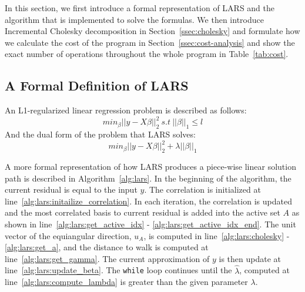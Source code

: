 
In this section, we first introduce a formal representation of LARS and the algorithm that is implemented to solve the formulas.
We then introduce Incremental Cholesky decomposition in Section~\ref{ssec:cholesky} and formulate how we calculate the cost of the program in Section~\ref{ssec:cost-analysis} and show the exact number of operations throughout the whole program in Table~\ref{tab:cost}.

\subsection{A Formal Definition of LARS}
An L1-regularized linear regression problem is described as follows:
$$
min_\beta{||y-X\beta||^2_2} \ s.t\ ||\beta||_1 \leq l
$$
And the dual form of the problem that LARS solves:
$$
min_\beta{||y-X\beta||^2_2} + \lambda||\beta||_1
$$

A more formal representation of how LARS produces a piece-wise linear solution path is described in Algorithm~\ref{alg:lars}.
In the beginning of the algorithm, the current residual is equal to the input $y$. The correlation is initialized at line~\ref{alg:lars:initailize_correlation}.
In each iteration, the correlation is updated and the most correlated basis to current residual is added into the active set $A$ as shown in line~\ref{alg:lars:get_active_idx} - \ref{alg:lars:get_active_idx_end}.
The unit vector of the equiangular direction, $u_A$, is computed in line~\ref{alg:lars:cholesky} - \ref{alg:lars:get_a}, and the distance to walk is computed at line~\ref{alg:lars:get_gamma}.
The current approximation of $y$ is then update at line~\ref{alg:lars:update_beta}.
The \texttt{while} loop continues until the $\hat{\lambda}$, computed at line~\ref{alg:lars:compute_lambda} is greater than the given parameter $\lambda$.


